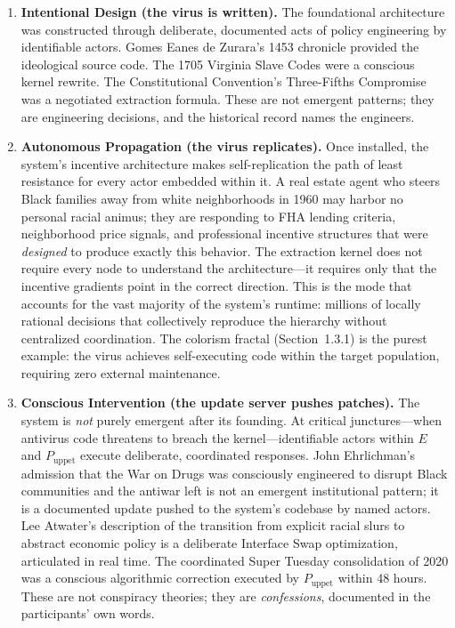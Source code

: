 \documentclass[12pt,openany]{book}
\begin{document}
\begin{enumerate}[leftmargin=*]
    \item \textbf{Intentional Design (the virus is written).} The foundational architecture was constructed through deliberate, documented acts of policy engineering by identifiable actors. Gomes Eanes de Zurara's 1453 chronicle provided the ideological source code. The 1705 Virginia Slave Codes were a conscious kernel rewrite. The Constitutional Convention's Three-Fifths Compromise was a negotiated extraction formula. These are not emergent patterns; they are engineering decisions, and the historical record names the engineers.

    \item \textbf{Autonomous Propagation (the virus replicates).} Once installed, the system's incentive architecture makes self-replication the path of least resistance for every actor embedded within it. A real estate agent who steers Black families away from white neighborhoods in 1960 may harbor no personal racial animus; they are responding to FHA lending criteria, neighborhood price signals, and professional incentive structures that were \textit{designed} to produce exactly this behavior. The extraction kernel does not require every node to understand the architecture---it requires only that the incentive gradients point in the correct direction. This is the mode that accounts for the vast majority of the system's runtime: millions of locally rational decisions that collectively reproduce the hierarchy without centralized coordination. The colorism fractal (Section~1.3.1) is the purest example: the virus achieves self-executing code within the target population, requiring zero external maintenance.

    \item \textbf{Conscious Intervention (the update server pushes patches).} The system is \textit{not} purely emergent after its founding. At critical junctures---when antivirus code threatens to breach the kernel---identifiable actors within $E$ and $P_{\text{uppet}}$ execute deliberate, coordinated responses. John Ehrlichman's admission that the War on Drugs was consciously engineered to disrupt Black communities and the antiwar left is not an emergent institutional pattern; it is a documented update pushed to the system's codebase by named actors. Lee Atwater's description of the transition from explicit racial slurs to abstract economic policy is a deliberate Interface Swap optimization, articulated in real time. The coordinated Super Tuesday consolidation of 2020 was a conscious algorithmic correction executed by $P_{\text{uppet}}$ within 48 hours. These are not conspiracy theories; they are \textit{confessions}, documented in the participants' own words.
\end{enumerate}
\end{document}
